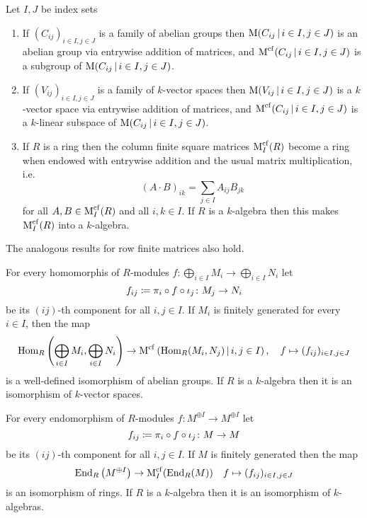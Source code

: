\begin{lemma}
  \label{lemma: structure on infinite matrices}
  Let $I, J$ be index sets
  \begin{enumerate}
    \item
      If $(C_{ij})_{i \in I, j \in J}$ is a family of abelian groups then $\Mat(C_{ij} \suchthat i \in I, j \in J)$ is an abelian group via entrywise addition of matrices, and $\Mat^{\cf}(C_{ij} \suchthat i \in I, j \in J)$ is a subgroup of $\Mat(C_{ij} \suchthat i \in I, j \in J)$.
    \item
      If $(V_{ij})_{i \in I, j \in J}$ is a family of $k$-vector spaces then $\Mat(V_{ij} \suchthat i \in I, j \in J)$ is a $k$-vector space via entrywise addition of matrices, and $\Mat^{\cf}(C_{ij} \suchthat i \in I, j \in J)$ is a $k$-linear subspace of $\Mat(C_{ij} \suchthat i \in I, j \in J)$.
    \item
      If $R$ is a ring then the column finite square matrices $\operatorname{M}^{{\operatorname{cf}}}_I(R)$ become a ring when endowed with entrywise addition and the usual matrix multiplication, i.e.\
      \[
          (A \cdot B)_{ik}
        = \sum_{j \in I} A_{ij} B_{jk}
      \]
      for all $A, B \in \operatorname{M}^{{\operatorname{cf}}}_I(R)$ and all $i, k \in I$.
      If $R$ is a $k$-algebra then this makes $\operatorname{M}^{{\operatorname{cf}}}_I(R)$ into a $k$-algebra.
  \end{enumerate}
  The analogous results for row finite matrices also hold.
\end{lemma}


\begin{corollary}
  For every homomorphis of $R$-modules $f \colon \bigoplus_{i \in I} M_i \to \bigoplus_{i \in I} N_i$ let
  \[
              f_{ij}
    \coloneqq  \pi_i \circ f \circ \iota_j
    \colon    M_j
    \to       N_i
  \]
  be its $(ij)$-th component for all $i, j \in I$.
  If $M_i$ is finitely generated for every $i \in I$, then the map
  \[
            \Hom_R\left( \bigoplus_{i \in I} M_i, \bigoplus_{i \in I} N_i \right)
    \to     \Mat^{\cf}\left( \Hom_R(M_i, N_j) \suchthat i,j \in I \right),
    \quad   f
    \mapsto (f_{ij})_{i \in I, j \in J}
  \]
  is a well-defined isomorphism of abelian groups.
  If $R$ is a $k$-algebra then it is an isomorphism of $k$-vector spaces.
\end{corollary}




\begin{corollary}
  \label{corollary: endomorphism ring of sum power of fg module}
  For every endomorphism of $R$-modules $f \colon M^{\oplus I} \to M^{\oplus I}$ let
  \[
              f_{ij}
    \coloneqq  \pi_i \circ f \circ \iota_j
    \colon    M
    \to       M
  \]
  be its $(ij)$-th component for all $i, j \in I$.
  If $M$ is finitely generated then the map
    \[
            \operatorname{End}_R\left( M^{\oplus I} \right)
    \to     \operatorname{M}^{{\operatorname{cf}}}_I( \operatorname{End}_R(M) )
    \quad   f
    \mapsto (f_{ij})_{i \in I, j \in J}
  \]
  is an isomorphism of rings.
  If $R$ is a $k$-algebra then it is an isomorphism of $k$-algebras.
\end{corollary}







